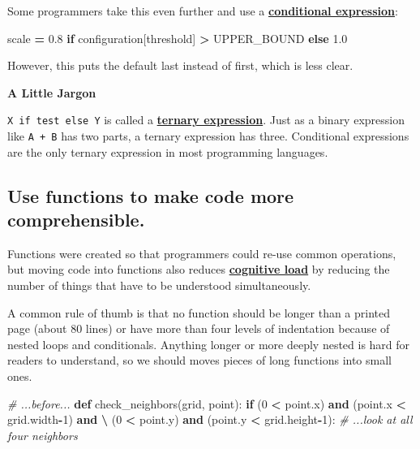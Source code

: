 \documentclass[
]{krantz}
\makeatletter
\newenvironment{Shaded}{\begin{snugshade}}{\end{snugshade}}
\newcommand{\CommentTok}[1]{\textcolor[rgb]{0.56,0.35,0.01}{\textit{#1}}}
\newcommand{\ControlFlowTok}[1]{\textcolor[rgb]{0.13,0.29,0.53}{\textbf{#1}}}
\newcommand{\DecValTok}[1]{\textcolor[rgb]{0.00,0.00,0.81}{#1}}
\newcommand{\FloatTok}[1]{\textcolor[rgb]{0.00,0.00,0.81}{#1}}
\newcommand{\KeywordTok}[1]{\textcolor[rgb]{0.13,0.29,0.53}{\textbf{#1}}}
\newcommand{\NormalTok}[1]{#1}
\newcommand{\OperatorTok}[1]{\textcolor[rgb]{0.81,0.36,0.00}{\textbf{#1}}}
\newcommand{\StringTok}[1]{\textcolor[rgb]{0.31,0.60,0.02}{#1}}
\renewenvironment{quote}{\begin{VF}}{\end{VF}}
\newenvironment{kframe}{%
\medskip{}
\setlength{\fboxsep}{.8em}
 \def\at@end@of@kframe{}%
 \ifinner\ifhmode%
  \def\at@end@of@kframe{\end{minipage}}%
  \begin{minipage}{\columnwidth}%
 \fi\fi%
 \def\FrameCommand##1{\hskip\@totalleftmargin \hskip-\fboxsep
 \colorbox{shadecolor}{##1}\hskip-\fboxsep
     \hskip-\linewidth \hskip-\@totalleftmargin \hskip\columnwidth}%
 \MakeFramed {\advance\hsize-\width
   \@totalleftmargin\z@ \linewidth\hsize
   \@setminipage}}%
 {\par\unskip\endMakeFramed%
 \at@end@of@kframe}
\renewenvironment{Shaded}{\begin{kframe}}{\end{kframe}}
\newcommand{\gref}[2]{\hyperlink{#2}{\textbf{#1}}}
\makeatother
\begin{document}
Some programmers take this even further
and use a \gref{conditional expression}{conditional\_expression}:

\begin{Shaded}
\begin{Highlighting}[]
\NormalTok{scale }\OperatorTok{=} \FloatTok{0.8} \ControlFlowTok{if}\NormalTok{ configuration[}\StringTok{\textquotesingle{}threshold\textquotesingle{}}\NormalTok{] }\OperatorTok{\textgreater{}}\NormalTok{ UPPER\_BOUND }\ControlFlowTok{else} \FloatTok{1.0}
\end{Highlighting}
\end{Shaded}

However,
this puts the default last instead of first,
which is less clear.

\begin{quote}
\textbf{A Little Jargon}

\texttt{X\ if\ test\ else\ Y} is called a \gref{ternary expression}{ternary\_expression}.
Just as a binary expression like \texttt{A\ +\ B} has two parts,
a ternary expression has three.
Conditional expressions are the only ternary expression in most programming languages.
\end{quote}

\hypertarget{use-functions-to-make-code-more-comprehensible.}{%
\subsection{Use functions to make code more comprehensible.}\label{use-functions-to-make-code-more-comprehensible.}}

Functions were created so that programmers could re-use common operations,
but moving code into functions also reduces \gref{cognitive load}{cognitive\_load}
by reducing the number of things that have to be understood simultaneously.

A common rule of thumb is that
no function should be longer than a printed page (about 80 lines)
or have more than four levels of indentation because of nested loops and conditionals.
Anything longer or more deeply nested is hard for readers to understand,
so we should moves pieces of long functions into small ones.

\begin{Shaded}
\begin{Highlighting}[]
\CommentTok{\# ...before...}
\KeywordTok{def}\NormalTok{ check\_neighbors(grid, point):}
    \ControlFlowTok{if}\NormalTok{ (}\DecValTok{0} \OperatorTok{\textless{}}\NormalTok{ point.x) }\KeywordTok{and}\NormalTok{ (point.x }\OperatorTok{\textless{}}\NormalTok{ grid.width}\OperatorTok{{-}}\DecValTok{1}\NormalTok{) }\KeywordTok{and} \OperatorTok{\textbackslash{}}
\NormalTok{       (}\DecValTok{0} \OperatorTok{\textless{}}\NormalTok{ point.y) }\KeywordTok{and}\NormalTok{ (point.y }\OperatorTok{\textless{}}\NormalTok{ grid.height}\OperatorTok{{-}}\DecValTok{1}\NormalTok{):}
        \CommentTok{\# ...look at all four neighbors}
\end{Highlighting}
\end{Shaded}
\end{document}
